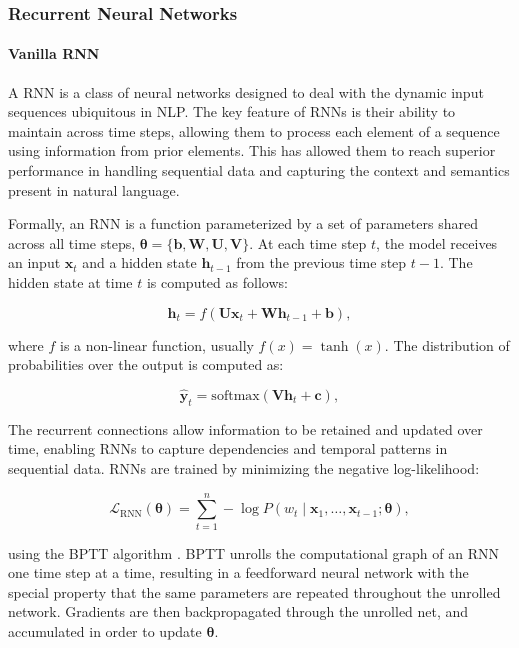 \subsubsection{Recurrent Neural Networks}

\paragraph{Vanilla \ac{RNN}} A \ac{RNN} is a class of neural networks designed to deal with the dynamic input sequences ubiquitous in \ac{NLP}. The key feature of \acp{RNN} is their ability to maintain  across time steps, allowing them to process each element of a sequence using information from prior elements. This has allowed them to reach superior performance in handling sequential data and capturing the context and semantics present in natural language.  

Formally, an \ac{RNN} is a function parameterized by a set of parameters shared across all time steps, $\bm{\theta} = \{\bm{b}, \bm{W}, \bm{U}, \bm{V}\}$. At each time step $t$, the model receives an input $\bm{x}_t$ and a hidden state $\bm{h}_{t-1}$ from the previous time step $t-1$. The hidden state at time $t$ is computed as follows:

\begin{equation}
    \bm{h}_{t} = f(\bm{U}\bm{x}_t + \bm{W}\bm{h}_{t-1} + \bm{b}),  
\end{equation}

where $f$ is a non-linear function, usually $f(x) = \tanh(x)$. The distribution of probabilities over the output is computed as:

\begin{equation}
    \hat{\bm{y}}_t = \mathrm{softmax}(\bm{V}\bm{h}_t + \bm{c}),
\label{eq-rnn}
\end{equation}

The recurrent connections allow information to be retained and updated over time, enabling \acp{RNN} to capture dependencies and temporal patterns in sequential data. \acp{RNN} are trained by minimizing the negative log-likelihood:

\begin{equation}
    \mathcal{L}_{\mathrm{RNN}}(\bm{\theta}) = \sum_{t=1}^{n} - \log P(w_t \mid \bm{x}_1, \ldots, \bm{x}_{t-1}; \bm{\theta}),
\end{equation}

using the \ac{BPTT} algorithm \citep{werbos1990backpropagation}. \ac{BPTT} unrolls the computational graph of an \ac{RNN} one time step at a time, resulting in a feedforward neural network with the special property that the same parameters are repeated throughout the unrolled network. Gradients are then backpropagated through the unrolled net, and accumulated in order to update $\bm{\theta}$. 


